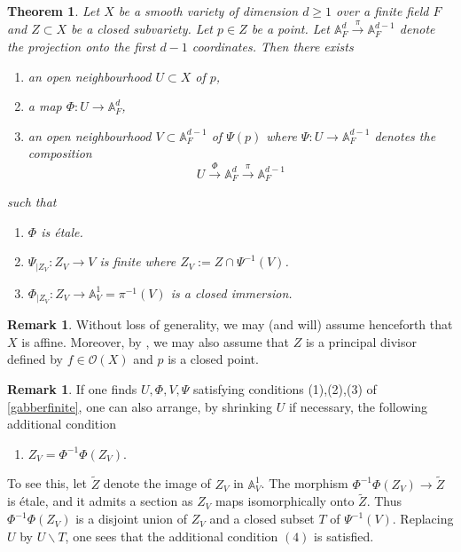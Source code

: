 \documentclass[10pt]{amsart}
\theoremstyle{plain}
\newtheorem{theorem}[thm]{Theorem}
\theoremstyle{definition}
\newtheorem{remark}[thm]{Remark}
\newcommand{\intersection}{\cap}
\newcommand{\sO}{{\mathcal O}}
\newcommand{\A}{{\mathbb A}}
\begin{document}
\begin{theorem}\label{gabberfinite}
Let $X$ be a smooth variety of dimension $d\geq 1$ over a finite field $F$ and $Z\subset X$ be a closed subvariety. Let $p\in Z$ be a point. Let $\A^d_F \xrightarrow{\pi} \A^{d-1}_F$ denote the projection onto the first $d-1$ coordinates.  Then there exists
\begin{enumerate}
\item[(i)] an open neighbourhood $ U\subset X$  of $p$,
\item[(ii)]  a map $\Phi:U\to \A_F^d$,
\item[(iii)] an open neighbourhood $V\subset \A^{d-1}_F$ of $\Psi(p)$ where 
 $\Psi:U\to \A_F^{d-1}$ denotes the composition
$$ U\xrightarrow{\Phi}\A_F^d \xrightarrow{\pi} \A_F^{d-1}$$
\end{enumerate}
such that 

\begin{enumerate}
\item $\Phi$ is \'{e}tale. 
\item $\Psi_{|Z_V}:Z_V \to V$ is finite where $Z_V:=Z\intersection \Psi^{-1}(V)$. 
\item $\Phi_{|Z_V}:Z_V \to \A^1_V= \pi^{-1}(V)$ is a closed immersion. 
\end{enumerate}
\end{theorem}
\begin{remark}\label{simplify}
Without loss of generality, we may (and will) assume henceforth that $X$ is affine. Moreover, by \cite[3.2]{chk}, we may also assume that  $Z$ is a principal divisor defined by $f\in \sO(X)$ and $p$ is a closed point. 
\end{remark}

\begin{remark}
If one finds $U,\Phi,V,\Psi$ satisfying conditions (1),(2),(3) of  \eqref{gabberfinite}, one can also arrange, by shrinking $U$ if necessary, the following additional condition 
\begin{enumerate}
\item[(4)]  $Z_V=\Phi^{-1}\Phi(Z_V)$.
\end{enumerate} 
To see this, let $\widetilde{Z}$ denote the image of $Z_V$ in $\A^1_V$. The morphism $\Phi^{-1}\Phi(Z_V)\to \widetilde{Z}$ is \'{e}tale, and it admits a section as $Z_V$ maps isomorphically onto $\widetilde{Z}$. Thus $\Phi^{-1}\Phi(Z_V)$ is a disjoint union of $Z_V$ and a closed subset  $T$ of $\Psi^{-1}(V)$. Replacing $U$ by $U\backslash T$, one sees that the additional condition $(4)$ is satisfied.  
\end{remark}
\end{document}
